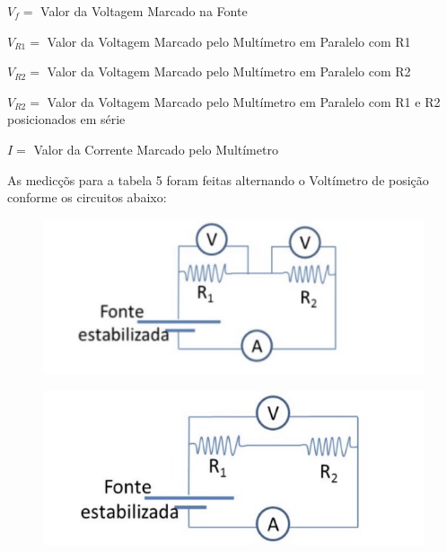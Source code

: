 \documentclass[article]{abntex2}
\begin{document}
$V_f =$ Valor da Voltagem Marcado na Fonte

$V_{R1} =$ Valor da Voltagem Marcado pelo Multímetro
 em Paralelo com R1

$V_{R2} =$ Valor da Voltagem Marcado pelo Multímetro 
em Paralelo com R2

$V_{R2} =$ Valor da Voltagem Marcado pelo Multímetro
 em Paralelo com R1 e R2 posicionados em série

$I =$ Valor da Corrente Marcado pelo Multímetro
\newline   

As medicçõs para a tabela 5 foram feitas alternando o Voltímetro 
de posição conforme os  circuitos abaixo:
\begin{figure}[htb]
\begin{center}
\includegraphics[scale=0.4]{circuito2.jpg} 
\end{center}
\end{figure}
\begin{figure}[htb]
\begin{center}
\includegraphics[scale=0.4]{circuito3.jpg} 
\end{center}
\end{figure}
\newpage
\end{document}
